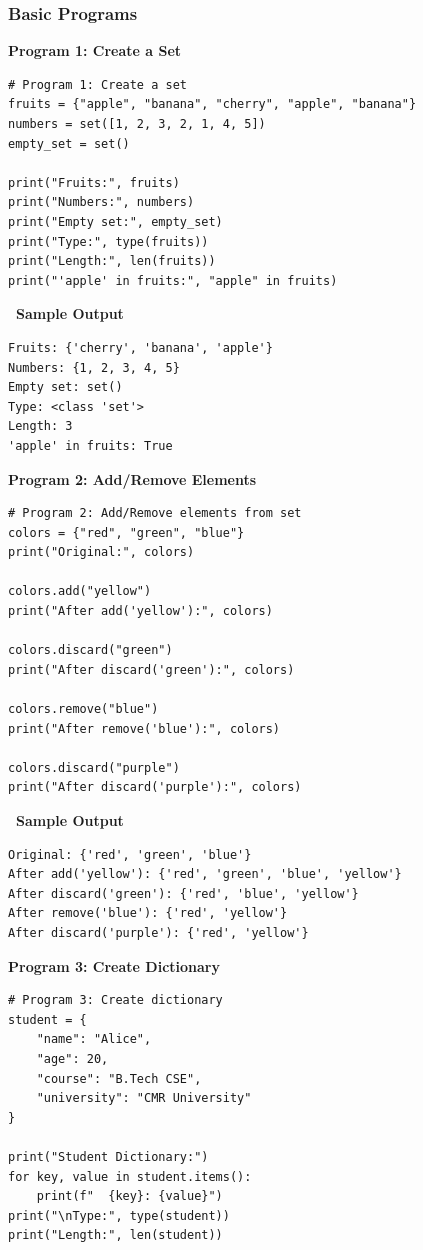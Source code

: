 \documentclass[12pt,a4paper]{article}
\newcommand{\outhead}{\noindent\colorbox{cmrgreen!25}%
  {\textbf{\small\color{cmrdark}~Sample Output~}}\par\vspace{-1pt}}
\begin{document}
\subsubsection{Basic Programs}

\textbf{Program 1: Create a Set}

\begin{lstlisting}
# Program 1: Create a set
fruits = {"apple", "banana", "cherry", "apple", "banana"}
numbers = set([1, 2, 3, 2, 1, 4, 5])
empty_set = set()

print("Fruits:", fruits)
print("Numbers:", numbers)
print("Empty set:", empty_set)
print("Type:", type(fruits))
print("Length:", len(fruits))
print("'apple' in fruits:", "apple" in fruits)
\end{lstlisting}

\outhead
\begin{lstlisting}[style=outputstyle]
Fruits: {'cherry', 'banana', 'apple'}
Numbers: {1, 2, 3, 4, 5}
Empty set: set()
Type: <class 'set'>
Length: 3
'apple' in fruits: True
\end{lstlisting}

\vspace{0.5cm}

\textbf{Program 2: Add/Remove Elements}

\begin{lstlisting}
# Program 2: Add/Remove elements from set
colors = {"red", "green", "blue"}
print("Original:", colors)

colors.add("yellow")
print("After add('yellow'):", colors)

colors.discard("green")
print("After discard('green'):", colors)

colors.remove("blue")
print("After remove('blue'):", colors)

colors.discard("purple")
print("After discard('purple'):", colors)
\end{lstlisting}

\outhead
\begin{lstlisting}[style=outputstyle]
Original: {'red', 'green', 'blue'}
After add('yellow'): {'red', 'green', 'blue', 'yellow'}
After discard('green'): {'red', 'blue', 'yellow'}
After remove('blue'): {'red', 'yellow'}
After discard('purple'): {'red', 'yellow'}
\end{lstlisting}

\vspace{0.5cm}

\textbf{Program 3: Create Dictionary}

\begin{lstlisting}
# Program 3: Create dictionary
student = {
    "name": "Alice",
    "age": 20,
    "course": "B.Tech CSE",
    "university": "CMR University"
}

print("Student Dictionary:")
for key, value in student.items():
    print(f"  {key}: {value}")
print("\nType:", type(student))
print("Length:", len(student))
\end{lstlisting}
\end{document}
